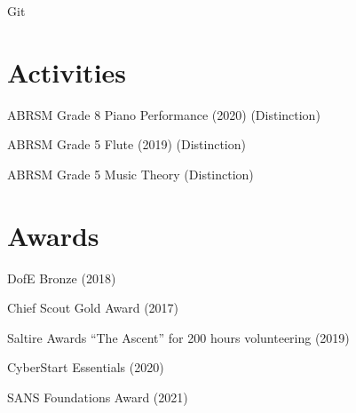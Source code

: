 \documentclass[]{hieudo-build}
\begin{document}
\begin{minipage}[t]{0.36\textwidth}
	Git \\
	\minisectionsep

	\section{Activities}

	ABRSM Grade 8 Piano Performance (2020) (Distinction) \\
	\minisectionsep

	ABRSM Grade 5 Flute (2019) (Distinction) \\
	\minisectionsep

	ABRSM Grade 5 Music Theory (Distinction)\\
	\minisectionsep


	\section{Awards}
	DofE Bronze (2018) \\
	\minisectionsep

	Chief Scout Gold Award (2017) \\
	\minisectionsep

	Saltire Awards “The Ascent” for 200 hours volunteering (2019) \\
	\minisectionsep

	CyberStart Essentials (2020) \\
	\minisectionsep

	SANS Foundations Award (2021) \\

	\sectionsep

\end{minipage}
\hfill
\end{document}
